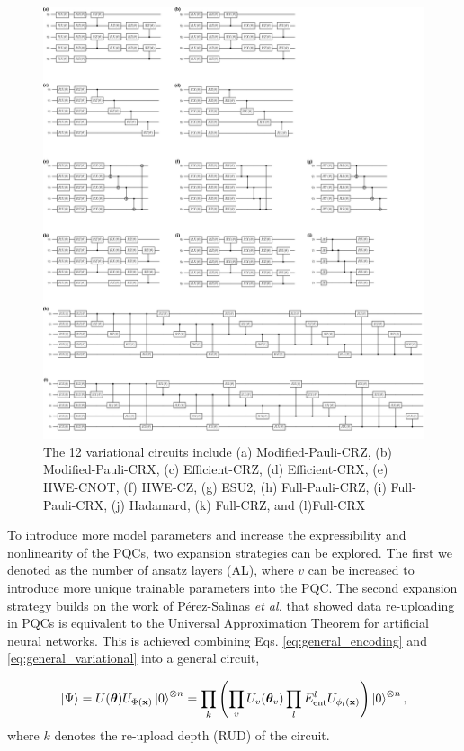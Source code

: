 \documentclass[journal=jacsat,manuscript=article]{achemso}
\begin{document}
\begin{figure}[H]
	\centering
	\includegraphics[width=\textwidth]{../images/ansatz/quantikz/combined.png}
	\caption{The 12 variational circuits include (a) Modified-Pauli-CRZ, (b) Modified-Pauli-CRX, (c) Efficient-CRZ, (d) Efficient-CRX, (e) HWE-CNOT, (f) HWE-CZ, (g) ESU2, (h) Full-Pauli-CRZ, (i) Full-Pauli-CRX, (j) Hadamard, (k) Full-CRZ, and (l)Full-CRX}
	\label{fig:ansatz}
\end{figure}


To introduce more model parameters and increase the expressibility and nonlinearity of the PQCs, two expansion strategies can be explored.
The first we denoted as the number of ansatz layers (AL), where $v$ can be increased to introduce more unique trainable parameters into the PQC.
The second expansion strategy builds on the work of P\'{e}rez-Salinas \textit{et al.} that showed data re-uploading in PQCs is equivalent to the Universal Approximation Theorem for artificial neural networks.\cite{perez-salinas_data_2020}
This is achieved combining Eqs. \ref{eq:general_encoding} and \ref{eq:general_variational} into a general circuit,

\begin{equation}
	\ket{\Psi} = U(\bm{\theta}) U_{\Phi(\mathbf{x})}\ket{0}^{\otimes n} = \prod_{k}
	\left( \prod_{v} U_{v}(\bm{\theta}_{v}) \prod_{l} E_{\text{ent}}^{l} U_{\phi_{l}(\mathbf{x})} \right)  \ket{0}^{\otimes n},
\end{equation}
where $k$ denotes the re-upload depth (RUD) of the circuit.
\end{document}
